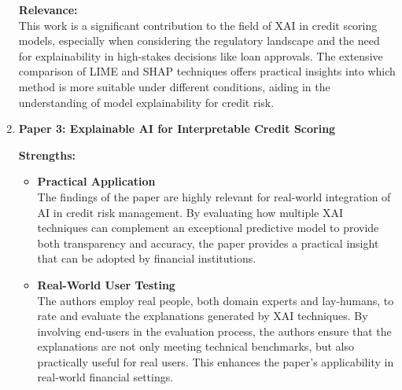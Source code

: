 \documentclass[12pt,a4paper]{article}
\begin{document}
\begin{enumerate}
    \textbf{Relevance:}\\
    This work is a significant contribution to the field of XAI in credit scoring models, especially when considering the regulatory landscape and the need for explainability in high-stakes decisions like loan approvals. The extensive comparison of LIME and SHAP techniques offers practical insights into which method is more suitable under different conditions, aiding in the understanding of model explainability for credit risk.

    \vspace{0.2cm}
    
    \item \textbf{Paper 3: Explainable AI for Interpretable Credit Scoring} 

    \textbf{Strengths:}\\
    \vspace{-2em}
    \begin{itemize}
        \item \textbf{Practical Application}\\
        The findings of the paper are highly relevant for real-world integration of AI in credit risk management. By evaluating how multiple XAI techniques can complement an exceptional predictive model to provide both transparency and accuracy, the paper provides a practical insight that can be adopted by financial institutions.
        \item \textbf{Real-World User Testing}\\
        The authors employ real people, both domain experts and lay-humans, to rate and evaluate the explanations generated by XAI techniques. By involving end-users in the evaluation process, the authors ensure that the explanations are not only meeting technical benchmarks, but also practically useful for real users. This enhances the paper’s applicability in real-world financial settings.
    \end{itemize}


\end{enumerate}
\end{document}
